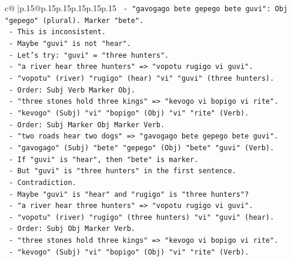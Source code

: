 \documentclass{article}
\begin{document}
{\begin{supertabular}{c@{$\;$}|p{.15\linewidth}@{}p{.15\linewidth}p{.15\linewidth}p{.15\linewidth}p{.15\linewidth}p{.15\linewidth}}
{{{\texttt{                  {-} "gavogago bete gepego bete guvi": Obj "gepego" (plural). Marker "bete".} \\
\texttt{                  {-} This is inconsistent.} \\
\texttt{                  {-} Maybe "guvi" is not "hear".} \\
\texttt{                  {-} Let's try: "guvi" = "three hunters".} \\
\texttt{                  {-} "a river hear three hunters" => "vopotu rugigo vi guvi".} \\
\texttt{                    {-} "vopotu" (river) "rugigo" (hear) "vi" "guvi" (three hunters).} \\
\texttt{                    {-} Order: Subj Verb Marker Obj.} \\
\texttt{                  {-} "three stones hold three kings" => "kevogo vi bopigo vi rite".} \\
\texttt{                    {-} "kevogo" (Subj) "vi" "bopigo" (Obj) "vi" "rite" (Verb).} \\
\texttt{                    {-} Order: Subj Marker Obj Marker Verb.} \\
\texttt{                  {-} "two roads hear two dogs" => "gavogago bete gepego bete guvi".} \\
\texttt{                    {-} "gavogago" (Subj) "bete" "gepego" (Obj) "bete" "guvi" (Verb).} \\
\texttt{                    {-} If "guvi" is "hear", then "bete" is marker.} \\
\texttt{                    {-} But "guvi" is "three hunters" in the first sentence.} \\
\texttt{                    {-} Contradiction.} \\
\texttt{                  {-} Maybe "guvi" is "hear" and "rugigo" is "three hunters"?} \\
\texttt{                    {-} "a river hear three hunters" => "vopotu rugigo vi guvi".} \\
\texttt{                    {-} "vopotu" (river) "rugigo" (three hunters) "vi" "guvi" (hear).} \\
\texttt{                    {-} Order: Subj Obj Marker Verb.} \\
\texttt{                    {-} "three stones hold three kings" => "kevogo vi bopigo vi rite".} \\
\texttt{                    {-} "kevogo" (Subj) "vi" "bopigo" (Obj) "vi" "rite" (Verb).} \\
}}}
\end{supertabular}}
\end{document}
